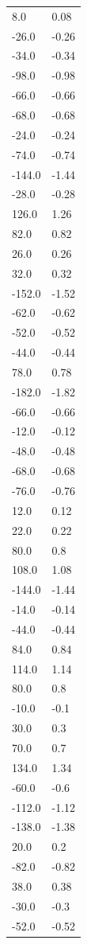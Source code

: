 \begin{longtable}{ll}
8.0 & 0.08 \\
-26.0 & -0.26 \\
-34.0 & -0.34 \\
-98.0 & -0.98 \\
-66.0 & -0.66 \\
-68.0 & -0.68 \\
-24.0 & -0.24 \\
-74.0 & -0.74 \\
-144.0 & -1.44 \\
-28.0 & -0.28 \\
126.0 & 1.26 \\
82.0 & 0.82 \\
26.0 & 0.26 \\
32.0 & 0.32 \\
-152.0 & -1.52 \\
-62.0 & -0.62 \\
-52.0 & -0.52 \\
-44.0 & -0.44 \\
78.0 & 0.78 \\
-182.0 & -1.82 \\
-66.0 & -0.66 \\
-12.0 & -0.12 \\
-48.0 & -0.48 \\
-68.0 & -0.68 \\
-76.0 & -0.76 \\
12.0 & 0.12 \\
22.0 & 0.22 \\
80.0 & 0.8 \\
108.0 & 1.08 \\
-144.0 & -1.44 \\
-14.0 & -0.14 \\
-44.0 & -0.44 \\
84.0 & 0.84 \\
114.0 & 1.14 \\
80.0 & 0.8 \\
-10.0 & -0.1 \\
30.0 & 0.3 \\
70.0 & 0.7 \\
134.0 & 1.34 \\
-60.0 & -0.6 \\
-112.0 & -1.12 \\
-138.0 & -1.38 \\
20.0 & 0.2 \\
-82.0 & -0.82 \\
38.0 & 0.38 \\
-30.0 & -0.3 \\
-52.0 & -0.52 \\

\end{longtable}
